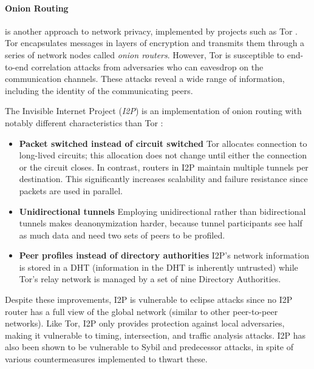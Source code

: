 \paragraph{Onion Routing} is another approach to network privacy, implemented by projects such as Tor \cite{tor}. Tor encapsulates messages in layers of encryption and transmits them through a series of network nodes called \textit{onion routers}. However, Tor is susceptible to end-to-end correlation attacks from adversaries who can eavesdrop on the communication channels. These attacks reveal a wide range of information, including the identity of the communicating peers.

The Invisible Internet Project (\textit{I2P}) is an implementation of onion routing with notably different characteristics than Tor \cite{i2p}:

\begin{itemize}

      \item \textbf{Packet switched instead of circuit switched}
            Tor allocates connection to long-lived circuits; this allocation does not change until either the connection or the circuit closes. In contrast, routers in I2P maintain multiple tunnels per destination. This significantly increases scalability and failure resistance since packets are used in parallel.

      \item \textbf{Unidirectional tunnels}
            Employing unidirectional rather than bidirectional tunnels makes deanonymization harder, because tunnel participants see half as much data and need two sets of peers to be profiled.

      \item \textbf{Peer profiles instead of directory authorities}
            I2P’s network information is stored in a DHT (information in the DHT is inherently untrusted) while Tor’s relay network is managed by a set of nine Directory Authorities.
\end{itemize}

Despite these improvements, I2P is vulnerable to eclipse attacks since no I2P router has a full view of the global network (similar to other peer-to-peer networks). Like Tor, I2P only provides protection against local adversaries, making it vulnerable to timing, intersection, and traffic analysis attacks. I2P has also been shown to be vulnerable to Sybil and predecessor attacks, in spite of various countermeasures implemented to thwart these.

